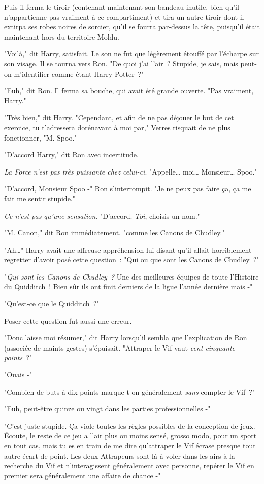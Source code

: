 Puis il ferma le tiroir (contenant maintenant son bandeau inutile, bien qu'il n'appartienne pas vraiment à ce compartiment) et tira un autre tiroir dont il extirpa ses robes noires de sorcier, qu'il se fourra par-dessus la tête, puisqu'il était maintenant hors du territoire Moldu.

"Voilà," dit Harry, satisfait. Le son ne fut que légèrement étouffé par l'écharpe sur son visage. Il se tourna vers Ron. "De quoi j'ai l'air~? Stupide, je sais, mais peut-on m'identifier comme étant Harry Potter~?"

"Euh," dit Ron. Il ferma sa bouche, qui avait été grande ouverte. "Pas vraiment, Harry."

"Très bien," dit Harry. "Cependant, et afin de ne pas déjouer le but de cet exercice, tu t'adressera dorénavant à moi par," Verres risquait de ne plus fonctionner, "M. Spoo."

"D'accord Harry," dit Ron avec incertitude.

\emph{La Force n'est pas très puissante chez celui-ci}. "Appelle… moi… Monsieur… Spoo."

"D'accord, Monsieur Spoo -" Ron s'interrompit. "Je ne peux pas faire ça, ça me fait me sentir stupide."

\emph{Ce n'est pas qu'une sensation}. "D'accord. \emph{Toi}, choisis un nom."

"M. Canon," dit Ron immédiatement. "comme les Canons de Chudley."

"Ah…" Harry avait une affreuse appréhension lui disant qu'il allait horriblement regretter d'avoir posé cette question~: "Qui ou que sont les Canons de Chudley~?"

"\emph{Qui sont les Canons de Chudley~?} Une des meilleures équipes de toute l'Histoire du Quidditch~! Bien sûr ils ont finit derniers de la ligue l'année dernière mais -"

"Qu'est-ce que le Quidditch~?"

Poser cette question fut aussi une erreur.

"Donc laisse moi résumer," dit Harry lorsqu'il sembla que l'explication de Ron (associée de maints gestes) s'épuisait. "Attraper le Vif vaut \emph{cent cinquante points}~?"

"Ouais -"

"Combien de buts à dix points marque-t-on généralement \emph{sans} compter le Vif~?"

"Euh, peut-être quinze ou vingt dans les parties professionnelles -"

"C'est juste stupide. Ça viole toutes les règles possibles de la conception de jeux. Écoute, le reste de ce jeu a l'air plus ou moins sensé, grosso modo, pour un sport en tout cas, mais tu es en train de me dire qu'attraper le Vif écrase presque tout autre écart de point. Les deux Attrapeurs sont là à voler dans les airs à la recherche du Vif et n'interagissent généralement avec personne, repérer le Vif en premier sera généralement une affaire de chance -"

